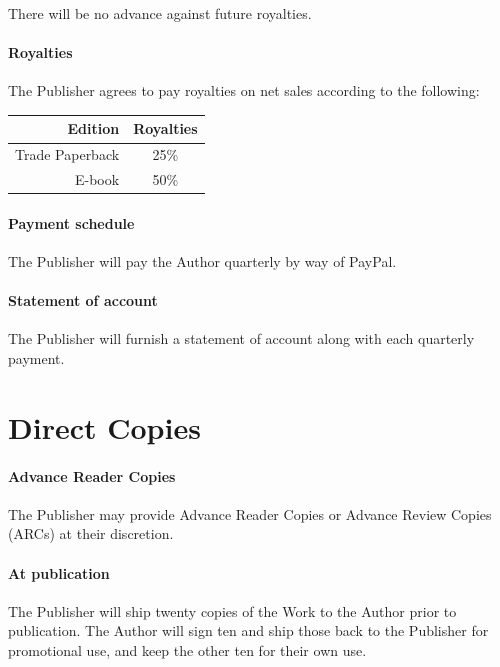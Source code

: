 \documentclass[12pt,letterpaper]{article}
\def\PrintRoyalties{25\%}
\def\DigitalRoyalties{50\%}
\def\PaymentMechanism{PayPal} %
\begin{document}
There will be no advance against future royalties.

\paragraph{Royalties}

The Publisher agrees to pay royalties on net sales according to the following:

\begin{center}
\begin{tabular}{r c}
    \textbf{Edition} & \textbf{Royalties} \\ \hline
    Trade Paperback & \PrintRoyalties \\
    E-book & \DigitalRoyalties \\
    \hline
\end{tabular}
\end{center}

\paragraph{Payment schedule}

The Publisher will pay the Author quarterly by way of \PaymentMechanism.

\paragraph{Statement of account}

The Publisher will furnish a statement of account along with each quarterly payment.

\section{Direct Copies}

\paragraph{Advance Reader Copies} The Publisher may provide Advance Reader Copies or Advance Review Copies (ARCs) at their discretion.

\paragraph{At publication} The Publisher will ship twenty copies of the Work to the Author prior to publication. The Author will sign ten and ship those back to the Publisher for promotional use, and keep the other ten for their own use.
\end{document}
